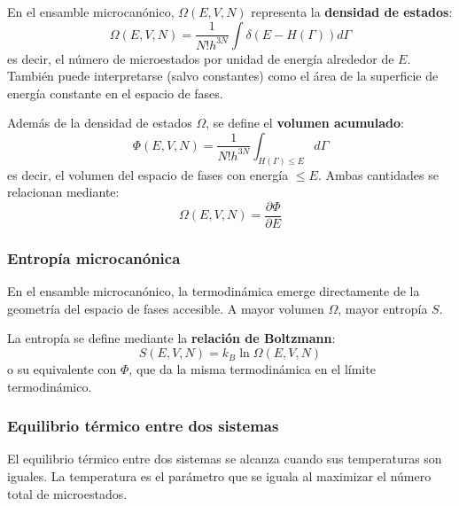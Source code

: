 \documentclass[]{article}
\numberwithin{equation}{section}
\newcommand{\0}{\textcolor{gray}{0}}
\begin{document}
En el ensamble microcanónico, \(\Omega(E,V,N)\) representa la \textbf{densidad de estados}:
\begin{equation}
	\Omega(E,V,N) = \frac{1}{N!h^{3N}}\int\delta(E-H(\Gamma))d\Gamma
\end{equation}
es decir, el número de microestados por unidad de energía alrededor de \(E\). También puede interpretarse (salvo constantes) como el área de la superficie de energía constante en el espacio de fases.

Además de la densidad de estados \(\Omega\), se define el \textbf{volumen acumulado}:
\begin{equation}
	\Phi(E,V,N) = \frac{1}{N!h^{3N}}\int_{H(\Gamma)\leq E}d\Gamma
\end{equation}
es decir, el volumen del espacio de fases con energía \(\leq E\). Ambas cantidades se relacionan mediante:
\begin{equation}
	\Omega(E,V,N) = \frac{\partial\Phi}{\partial E}
\end{equation}

\subsubsection{Entropía microcanónica}
En el ensamble microcanónico, la termodinámica emerge directamente de la geometría del espacio de fases accesible. A mayor volumen \(\Omega\), mayor entropía \(S\).

La entropía se define mediante la \textbf{relación de Boltzmann}:
\begin{equation}
	S(E,V,N) = k_B \ln{\Omega(E,V,N)}
\end{equation}
o su equivalente con \(\Phi\), que da la misma termodinámica en el límite termodinámico.

\subsubsection{Equilibrio térmico entre dos sistemas}
El equilibrio térmico entre dos sistemas se alcanza cuando sus temperaturas son iguales. La temperatura es el parámetro que se iguala al maximizar el número total de microestados.
\end{document}
